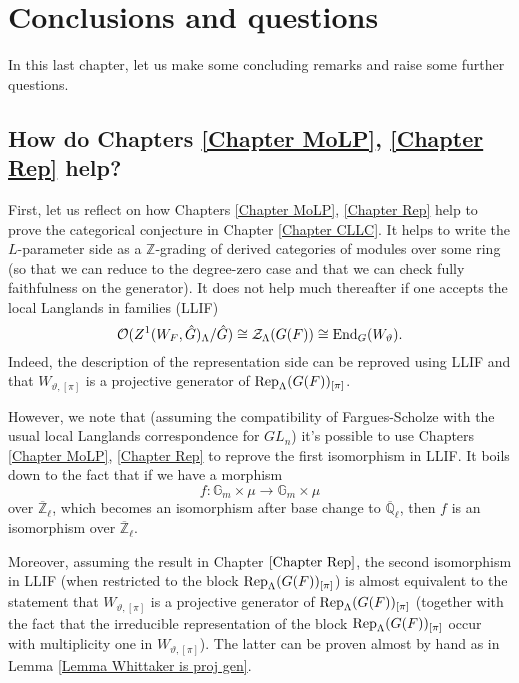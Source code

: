 \chapter{Conclusions and questions}\label{Chapter conclusion}


In this last chapter, let us make some concluding remarks and raise some further questions.

\section{How do Chapters \ref{Chapter MoLP}, \ref{Chapter Rep} help?}

First, let us reflect on how Chapters \ref{Chapter MoLP}, \ref{Chapter Rep} help to prove the categorical conjecture in Chapter \ref{Chapter CLLC}. It helps to write the $L$-parameter side as a $\mathbb{Z}$-grading of derived categories of modules over some ring (so that we can reduce to the degree-zero case and that we can check fully faithfulness on the generator). It does not help much thereafter if one accepts the local Langlands in families (LLIF)
$$\mathcal{O}(Z^1(W_F, \hat{G})_{\Lambda}/\hat{G}) \cong \mathcal{Z}_{\Lambda}(G(F)) \cong \operatorname{\operatorname{End}}_{G}(W_{\vartheta}).$$
Indeed, the description of the representation side can be reproved using LLIF and that $W_{\vartheta, [\pi]}$ is a projective generator of $\operatorname{\operatorname{Rep}}_{\Lambda}(G(F))_{[\pi]}$.

However, we note that (assuming the compatibility of Fargues-Scholze with the usual local Langlands correspondence for $GL_n$) it's possible to use Chapters \ref{Chapter MoLP}, \ref{Chapter Rep} to reprove the first isomorphism in LLIF. It boils down to the fact that if we have a morphism 
$$f: \mathbb{G}_m \times \mu \longrightarrow \mathbb{G}_m \times \mu$$
over $\overline{\mathbb{Z}}_{\ell}$, which becomes an isomorphism after base change to $\overline{\mathbb{Q}}_{\ell}$, then $f$ is an isomorphism over $\overline{\mathbb{Z}}_{\ell}$.

Moreover, assuming the result in Chapter $\ref{Chapter Rep}$, the second isomorphism in LLIF (when restricted to the block $\operatorname{\operatorname{Rep}}_{\Lambda}(G(F))_{[\pi]}$) is almost equivalent to the statement that $W_{\vartheta, [\pi]}$ is a projective generator of $\operatorname{\operatorname{Rep}}_{\Lambda}(G(F))_{[\pi]}$ (together with the fact that the irreducible representation of the block $\operatorname{\operatorname{Rep}}_{\Lambda}(G(F))_{[\pi]}$ occur with multiplicity one in $W_{\vartheta, [\pi]}$). The latter can be proven almost by hand as in Lemma \ref{Lemma Whittaker is proj gen}.

